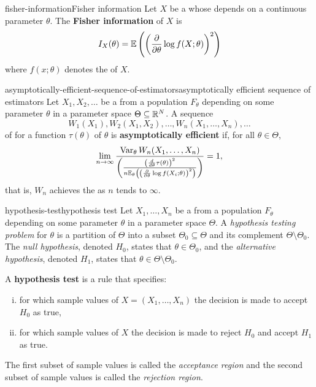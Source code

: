 \begin{topic}{fisher-information}{Fisher information}
    Let $X$ be a  whose  depends on a continuous parameter $\theta$. The \textbf{Fisher information} of $X$ is
    \[ I_X(\theta) = \mathbb{E} \left( \left( \frac{\partial}{\partial \theta} \log f(X; \theta) \right)^2 \right) \]
    where $f(x; \theta)$ denotes the  of $X$.
\end{topic}

\begin{topic}{asymptotically-efficient-sequence-of-estimators}{asymptotically efficient sequence of estimators}
    Let $X_1, X_2, \ldots$ be a  from a population $F_\theta$ depending on some parameter $\theta$ in a parameter space $\Theta \subseteq \mathbb{R}^N$. A sequence
    \[ W_1(X_1), W_2(X_1, X_2), \ldots, W_n(X_1, \ldots, X_n), \ldots \]
    of  for a function $\tau(\theta)$ of $\theta$ is \textbf{asymptotically efficient} if, for all $\theta \in \Theta$,
    \[ \lim_{n \to \infty} \frac{\operatorname{Var}_\theta W_n(X_1, \ldots, X_n)}{\left( \frac{ \left( \frac{d}{d \theta} \tau(\theta) \right)^2}{n \mathbb{E}_\theta \left( \left( \frac{\partial}{\partial \theta} \log f(X_i; \theta) \right)^2 \right) } \right)} = 1 , \]
    that is, $W_n$ achieves the  as $n$ tends to $\infty$.
\end{topic}

\begin{topic}{hypothesis-test}{hypothesis test}
    Let $X_1, \ldots, X_n$ be a  from a population $F_\theta$ depending on some parameter $\theta$ in a parameter space $\Theta$.
    A \textit{hypothesis testing problem} for $\theta$ is a partition of $\Theta$ into a subset $\Theta_0 \subseteq \Theta$ and its complement $\Theta \setminus \Theta_0$.
    The \textit{null hypothesis}, denoted $H_0$, states that $\theta \in \Theta_0$, and the \textit{alternative hypothesis}, denoted $H_1$, states that $\theta \in \Theta \setminus \Theta_0$.
    
    A \textbf{hypothesis test} is a rule that specifies:
    \begin{enumerate}[(i)]
        \item for which sample values of $X = (X_1, \ldots, X_n)$ the decision is made to accept $H_0$ as true,
        \item for which sample values of $X$ the decision is made to reject $H_0$ and accept $H_1$ as true.
    \end{enumerate}
    The first subset of sample values is called the \textit{acceptance region} and the second subset of sample values is called the \textit{rejection region}.
\end{topic}

